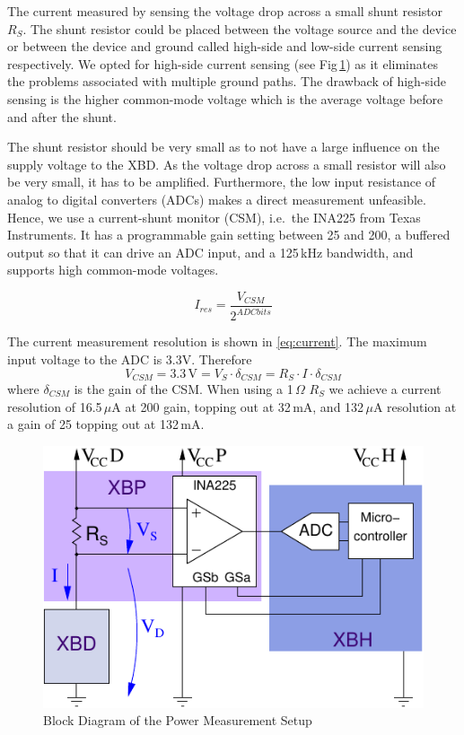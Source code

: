 \documentclass[twoside,11pt]{cergdoc}
\begin{document}
The current measured by sensing the voltage drop across a small shunt resistor $R_S$.
The shunt resistor could be placed between the voltage source and the device
or between the device and ground called high-side and low-side current sensing
respectively. We opted for high-side current sensing (see Fig\,\ref{fig:ina225})
as it eliminates the problems associated with multiple ground paths. 
The drawback of high-side sensing is the higher common-mode voltage which is the
average voltage before and after the shunt. 


The shunt resistor should be very small as to not have a large influence on 
the supply voltage to the XBD. As the voltage drop across a small resistor will
also be very small, it has to be amplified. Furthermore, the low input resistance
of analog to digital converters (ADCs) makes a direct measurement unfeasible.  
Hence, we use a current-shunt monitor (CSM), i.e.\ the INA225 from Texas Instruments.
It has a programmable gain setting between 25 and 200, a buffered output so that it
can drive an ADC input, and a 125\,kHz bandwidth, and supports high common-mode voltages.

\begin{equation}
  I_{res}=\frac{V_{CSM}}{2^{ADCbits}} \label{eq:current}
\end{equation}

\noindent The current measurement resolution is shown in \eqref{eq:current}. The maximum input voltage
to the ADC is 3.3V. Therefore
%
\[V_{CSM} = 3.3\,\mathrm{V} = V_S \cdot \delta_{CSM} = R_S \cdot I \cdot \delta_{CSM}\]
%
where $\delta_{CSM}$ is the gain of the CSM. When using a 1\,$\Omega$ $R_S$ we achieve
a current resolution of 16.5\,$\mu$A at 200
gain, topping out at 32\,mA, and 132\,$\mu$A resolution at a gain of 25 topping out at 132\,mA.

\begin{figure}[ht]
  \begin{center}
    \includegraphics[scale=1]{figures/ina225}
    \caption{Block Diagram of the Power Measurement Setup}\label{fig:ina225}
  \end{center}
\end{figure}
\end{document}
